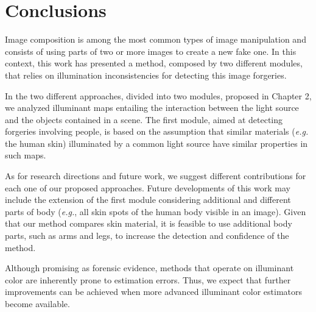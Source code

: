 \chapter*{Conclusions}

Image composition is among the most common types of image manipulation and consists of using parts of two or more images to create a new fake one. In this context, this work has presented a method, composed by two different modules, that relies on illumination inconsistencies for detecting this image forgeries.

In the two different approaches, divided into two modules, proposed in Chapter 2, we analyzed illuminant maps entailing the interaction between the light source and the objects contained in a scene. The first module, aimed at detecting forgeries involving people, is based on the assumption that similar materials (\emph{e.g.} the human skin) illuminated by a common light source have similar properties in such maps.

As for research directions and future work, we suggest different contributions for each one of our proposed approaches. Future developments of this work may include the extension of the first module considering additional and different parts of body (\emph{e.g.}, all skin spots of the human body visible in an image). Given that our method compares skin material, it is feasible to use additional body parts, such as arms and legs, to increase the detection and confidence of the method.

Although promising as forensic evidence, methods that operate on illuminant color are inherently prone to estimation errors. Thus, we expect that further improvements can be achieved when more advanced illuminant color estimators become available.